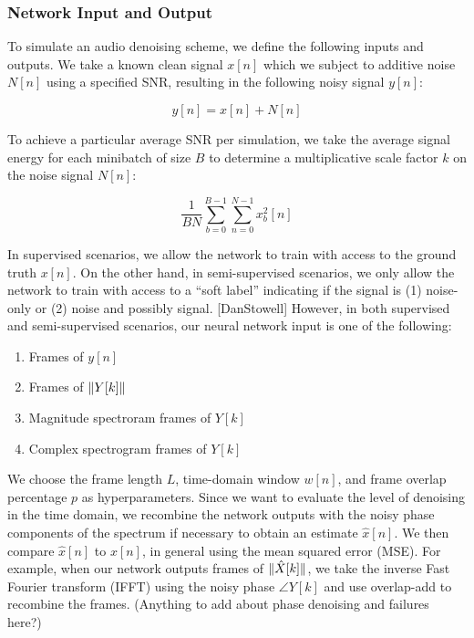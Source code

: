 
\subsubsection{Network Input and Output}
To simulate an audio denoising scheme, we define the following inputs and outputs. We take a known clean signal $x[n]$ which we subject to additive noise $N[n]$ using a specified SNR, resulting in the following noisy signal $y[n]$:

\begin{equation}
y[n] = x[n] + N[n]
\end{equation}

To achieve a particular average SNR per simulation, we take the average signal energy for each minibatch of size $B$ to determine a multiplicative scale factor $k$ on the noise signal $N[n]$:

\begin{equation}
\dfrac{1}{BN}\sum_{b=0}^{B-1} \sum_{n=0}^{N-1} x_{b}^{2}[n]
\end{equation}


In supervised scenarios, we allow the network to train with access to the ground truth $x[n]$. On the other hand, in semi-supervised scenarios, we only allow the network to train with access to a ``soft label'' indicating if the signal is (1) noise-only or (2) noise and possibly signal. [DanStowell] However, in both supervised and semi-supervised scenarios, our neural network input is one of the following:

\begin{enumerate}
    \item Frames of $y[n]$
    \item Frames of $\lVert Y[k]\rVert$
    \item Magnitude spectroram frames of $Y[k]$
    \item Complex spectrogram frames of $Y[k]$
\end{enumerate}

We choose the frame length $L$, time-domain window $w[n]$, and frame overlap percentage $p$ as hyperparameters. Since we want to evaluate the level of denoising in the time domain, we recombine the network outputs with the noisy phase components of the spectrum if necessary to obtain an estimate $\hat{x}[n]$. We then compare $\hat{x}[n]$ to $x[n]$, in general using the mean squared error (MSE). For example, when our network outputs frames of $\lVert\hat{X}[k]\rVert$, we take the inverse Fast Fourier transform (IFFT) using the noisy phase $\angle{Y[k]}$ and use overlap-add to recombine the frames. (Anything to add about phase denoising and failures here?)

